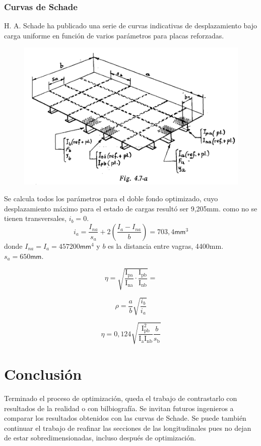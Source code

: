 \documentclass[onecolumn,10pt,titlepage]{article}
\newcommand{\unit}[1]{\textsf{#1}}
\newcommand{\milli}{\unit{m}}
\newcommand{\meter}{\unit{m}}
\newcommand{\si}[1]{#1}
\newcommand{\SI}[2]{#1\si{#2}}
\begin{document}
\subsubsection*{Curvas de Schade}
H. A. Schade ha publicado una serie de curvas indicativas de desplazamiento bajo carga uniforme en función de varios parámetros para placas reforzadas.
\begin{figure}[htb!]
	\centering
	\includegraphics[width=.7\textwidth]{fig/placaschade.png}
	
	\label{fig:placaschade}
\end{figure}

Se calcula todos los parámetros para el doble fondo optimizado, cuyo desplazamiento máximo para el estado de cargas resultó ser \SI{9,205}{\milli \meter}. como no se tienen transversales, $i_b=0$.
\[
i_{a}=\frac{I_{n a}}{s_{a}}+2\left(\frac{I_{a}-I_{n a}}{b}\right)=703,4\si{\milli \meter^3}
\]
donde $I_{na}=I_{a}=\SI{457200}{\milli \meter }^4$ y $b$ es la distancia entre vagras, \SI{4400}{\milli \meter}. $s_a=\SI{650}{\milli \meter}$.

\[
\eta=\sqrt{\frac{\mathrm{I}_{\mathrm{pa}}}{\mathrm{I}_{\mathrm{na}}} \cdot \frac{\mathrm{I}_{\mathrm{pb}}}{\mathrm{I}_{\mathrm{nb}}}} = 
\]


\[
\rho=\frac{a}{b} \sqrt{\frac{i_{b}}{i_{a}}}
\]

\[
\eta=0,124 \sqrt{\frac{\mathrm{I}^{2}_\mathrm{pb}}{\mathrm{I}_{\mathrm{a}} \mathrm{I}_{\mathrm{nb}}} \frac{b}{s_{\mathrm{b}}}}
\]












\section{Conclusión}
Terminado el proceso de optimización, queda el trabajo de contrastarlo con resultados de la realidad o con bilbiografía. Se invitan futuros ingenieros a comparar los resultados obtenidos con las curvas de Schade\citep{dominguez1969calculo}. Se puede también continuar el trabajo de reafinar las secciones de las longitudinales pues no dejan de estar sobredimensionadas, incluso después de optimización. 
\end{document}

